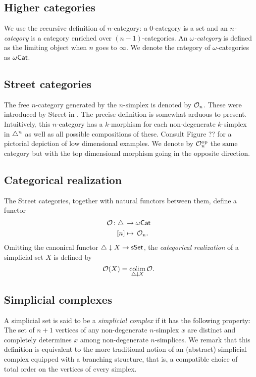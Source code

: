 \subsection{Higher categories}

We use the recursive definition of $n$-category: a $0$-category is a set and an \textit{$n$-category} is a category enriched over $(n-1)$-categories.
An \textit{\mbox{$\omega$-category}} is defined as the limiting object when $n$ goes to $\infty$.
We denote the category of $\omega$-categories as $\omega\mathsf{Cat}$.

\subsection{Street categories}

The free $n$-category generated by the $n$-simplex is denoted by $\mathcal{O}_n$.
These were introduced by Street in \cite{street1987orientals}.
The precise definition is somewhat arduous to present.
Intuitively, this $n$-category has a $k$-morphism for each non-degenerate $k$-simplex in $\triangle^n$ as well as all possible compositions of these.
Consult Figure ?? for a pictorial depiction of low dimensional examples.
We denote by $\mathcal{O}_n^{\mathrm{op}}$ the same category but with the top dimensional morphism going in the opposite direction.

\subsection{Categorical realization}

The Street categories, together with natural functors between them, define a functor
\[
\begin{split}
	\mathcal{O} \colon \triangle \, &\to \omega\mathsf{Cat} \\
	[n] &\mapsto \, \mathcal{O}_n.
\end{split}
\]
Omitting the canonical functor $\triangle \downarrow X \to \mathsf{sSet}$, the \textit{categorical realization} of a simplicial set $X$ is defined by
\[
\mathcal{O}(X) = \operatorname*{colim}_{\triangle \downarrow X} \mathcal{O}.
\]

\subsection{Simplicial complexes}

A simplicial set is said to be a \textit{simplicial complex} if it has the following property: The set of $n+1$ vertices of any non-degenerate $n$-simplex $x$ are distinct and completely determines $x$ among non-degenerate $n$-simplices.
We remark that this definition is equivalent to the more traditional notion of an (abstract) simplicial complex equipped with a branching structure, that is, a compatible choice of total order on the vertices of every simplex.

